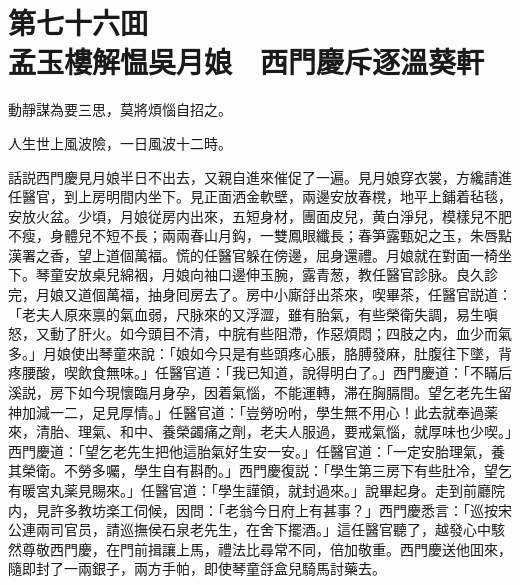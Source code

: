 
\chapter*{第七十六囬　\\孟玉樓解愠吳月娘　西門慶斥逐溫葵軒}


\begin{myquote}
動靜謀為要三思，莫將煩惱自招之。

人生世上風波險，一日風波十二時。
\end{myquote}

話説西門慶見月娘半日不出去，又親自進來催促了一遍。見月娘穿衣裳，方纔請進任醫官，到上房明間内坐下。見正面洒金軟壁，兩邊安放春櫈，地平上鋪着毡毯，安放火盆。少頃，月娘従房内出來，五短身材，團面皮兒，黄白淨兒，模樣兒不肥不瘦，身體兒不短不長；兩兩春山月鈎，一雙鳳眼纖長；春笋露甄妃之玉，朱唇點漢署之香，望上道個萬福。慌的任醫官躲在傍邊，屈身還禮。月娘就在對面一椅坐下。琴童安放桌兒綿裀，月娘向袖口邊伸玉腕，露青葱，教任醫官診脉。良久診完，月娘又道個萬福，抽身囘房去了。房中小廝㧱出茶來，喫畢茶，任醫官説道：「老夫人原來禀的氣血弱，尺脉來的又浮澀，雖有胎氣，有些榮衛失調，易生嗔怒，又動了肝火。如今頭目不清，中脘有些阻滯，作惡煩悶；四肢之内，血少而氣多。」月娘使出琴童來說：「娘如今只是有些頭疼心脹，胳膊發麻，肚腹往下墜，背疼腰酸，喫飲食無味。」任醫官道：「我已知道，說得明白了。」西門慶道：「不瞞后溪説，房下如今現懷臨月身孕，因着氣惱，不能運轉，滞在胸膈間。望乞老先生留神加減一二，足見厚情。」任醫官道：「豈勞吩咐，學生無不用心！此去就奉過薬來，清胎、理氣、和中、養榮蠲痛之劑，老夫人服過，要戒氣惱，就厚味也少喫。」西門慶道：「望乞老先生把他這胎氣好生安一安。」任醫官道：「一定安胎理氣，養其榮衛。不勞多囑，學生自有斟酌。」西門慶復説：「學生第三房下有些肚冷，望乞有暖宮丸薬見賜來。」任醫官道：「學生謹領，就封過來。」說畢起身。走到前廳院内，見許多教坊楽工伺候，因問：「老翁今日府上有甚事？」西門慶悉言：「巡按宋公連兩司官员，請巡撫侯石泉老先生，在舍下擺酒。」這任醫官聽了，越發心中駭然尊敬西門慶，在門前揖讓上馬，禮法比尋常不同，倍加敬重。西門慶送他囬來，隨即封了一兩銀子，兩方手帕，即使琴童㧱盒兒騎馬討藥去。

